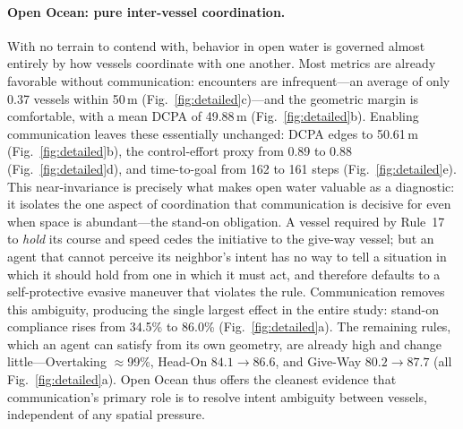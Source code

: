 \documentclass[final,5p,times,twocolumn]{elsarticle}
\begin{document}
{\paragraph{Open Ocean: pure inter-vessel coordination.}
With no terrain to contend with, behavior in open water is governed almost entirely by how vessels coordinate with one another. Most metrics are already favorable without communication: encounters are infrequent---an average of only 0.37 vessels within 50\,m (Fig.~\ref{fig:detailed}c)---and the geometric margin is comfortable, with a mean DCPA of 49.88\,m (Fig.~\ref{fig:detailed}b). Enabling communication leaves these essentially unchanged: DCPA edges to 50.61\,m (Fig.~\ref{fig:detailed}b), the control-effort proxy from 0.89 to 0.88 (Fig.~\ref{fig:detailed}d), and time-to-goal from 162 to 161 steps (Fig.~\ref{fig:detailed}e). This near-invariance is precisely what makes open water valuable as a diagnostic: it isolates the one aspect of coordination that communication is decisive for even when space is abundant---the stand-on obligation. A vessel required by Rule~17 to \emph{hold} its course and speed cedes the initiative to the give-way vessel; but an agent that cannot perceive its neighbor's intent has no way to tell a situation in which it should hold from one in which it must act, and therefore defaults to a self-protective evasive maneuver that violates the rule. Communication removes this ambiguity, producing the single largest effect in the entire study: stand-on compliance rises from 34.5\% to 86.0\% (Fig.~\ref{fig:detailed}a). The remaining rules, which an agent can satisfy from its own geometry, are already high and change little---Overtaking $\approx$99\%, Head-On $84.1 \rightarrow 86.6$, and Give-Way $80.2 \rightarrow 87.7$ (all Fig.~\ref{fig:detailed}a). Open Ocean thus offers the cleanest evidence that communication's primary role is to resolve intent ambiguity between vessels, independent of any spatial pressure.

}
\end{document}
